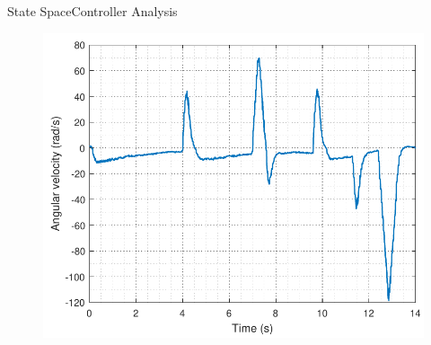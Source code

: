 \begin{frame}{State Space}{Controller Analysis}
\begin{minipage}{\linewidth}
\begin{minipage}{0.45\linewidth}
\begin{figure}[H]
   			\includegraphics[scale=.35]{Pictures/wheelSSTest}
   			\centering
   		\end{figure}
   	\end{minipage}
  \end{minipage}
\end{frame}
